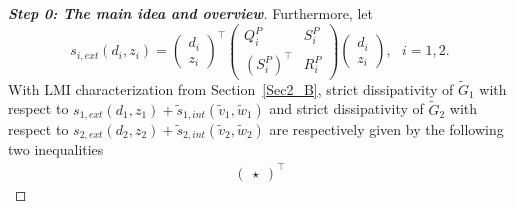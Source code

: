 \documentclass[11pt,a4paper,oneside,DIV=12,headings=small]{scrartcl}
\theoremstyle{plain}
\begin{document}
\begin{proof}[\textbf{Step 0: \textit{The main idea and overview}}]
Furthermore, let 
\[s_{i,ext}(d_i,z_i)=\left(\begin{smallmatrix} d_i \\ z_i \end{smallmatrix}\right)^\top \left(\begin{smallmatrix} Q^P_i & S^P_i \\ (S^P_i)^\top & R^P_i \end{smallmatrix}\right)\left(\begin{smallmatrix} d_i \\ z_i \end{smallmatrix}\right),\,\,\,\, i=1,2.\] 
With LMI characterization from Section~\ref{Sec2_B}, strict dissipativity of $\tilde{G}_1$ with respect to $s_{1,ext}(d_1,z_1)+\tilde{s}_{1,int}(\tilde{v}_1,\tilde{w}_1)$ and strict dissipativity of $\tilde{G}_2$ with respect to $s_{2,ext}(d_2,z_2)+\tilde{s}_{2,int}(\tilde{v}_2,\tilde{w}_2)$ are respectively given by the following two inequalities
\begin{multline}
\label{D1}
\begin{pmatrix} \star  \end{pmatrix}^\top

\end{multline}
\end{proof}
\end{document}

